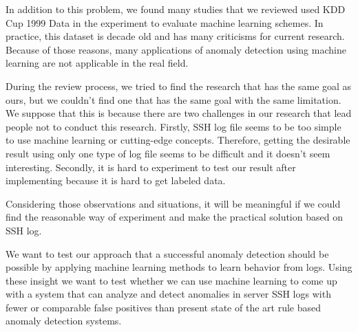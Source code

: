 \documentclass [11pt]{article}
\begin{document}
In addition to this problem, we found many studies that we reviewed used KDD Cup 1999 Data \cite{hettich1999uci}  in the experiment to evaluate machine learning schemes. In practice, this dataset is decade old and has many criticisms \cite{mahoney2003analysis,mchugh2000testing} for current research. Because of those reasons, many applications of anomaly detection using machine learning are not applicable in the real field. 

During the review process, we tried to find the research that has the same goal as ours, but we couldn't find one that has the same goal with the same limitation. We suppose that this is because there are two challenges in our research that lead people not to conduct this research. Firstly, SSH log file seems to be too simple to use machine learning or cutting-edge concepts. Therefore, getting the desirable result using only one type of log file seems to be difficult and it doesn't seem interesting. Secondly, it is hard to experiment to test our result after implementing because it is hard to get labeled data. 

Considering those observations and situations, it will be meaningful if we could find the reasonable way of experiment and make the practical solution based on SSH log. 

We want to test our approach that a successful anomaly detection should be possible by applying machine learning methods to learn behavior from logs. Using these insight we want to test whether we can use machine learning to come up with a system that can analyze and detect anomalies in server SSH logs with fewer or comparable false positives than present state of the art rule based anomaly detection systems. 



\end{document}
